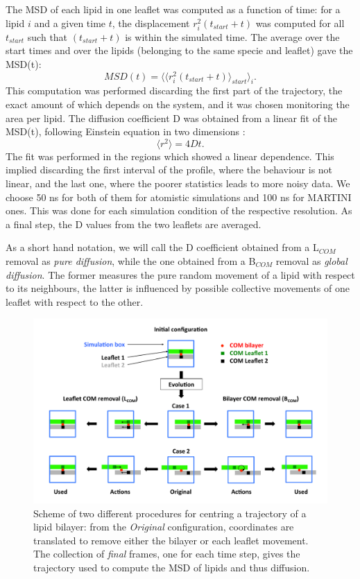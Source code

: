 \begin{itemize}
The MSD of each lipid in one leaflet was computed as a function of time: for a lipid $i$ and a given time $t$, the displacement $r_i^2(t_{start}+t)$ was computed for all $t_{start}$ such that $(t_{start}+t)$ is within the simulated time. The average over the start times and over the lipids (belonging to the same specie and leaflet) gave the MSD(t):
\begin{equation}
MSD(t) = \langle \langle r_i^2(t_{start}+t) \rangle_{start} \rangle_i.
\end{equation}
This computation was performed discarding the first part of the trajectory, the exact amount of which depends on the system, and it was chosen monitoring the area per lipid.
The diffusion coefficient D was obtained from a linear fit of the MSD(t), following Einstein equation in two dimensions \citep{Einstein1956}:
\begin{equation}
\langle r^2 \rangle = 4Dt.
\end{equation}
The fit was performed in the regions which showed a linear dependence. This implied discarding the first interval of the profile, where the behaviour is not linear, and the last one, where the poorer statistics leads to more noisy data. We choose 50 ns for both of them for atomistic simulations and 100 ns for MARTINI ones. This was done for each simulation condition of the respective resolution. As a final step, the D values from the two leaflets are averaged.

As a short hand notation, we will call the D coefficient obtained from a L$_{COM}$ removal as \emph{pure diffusion}, while the one obtained from a B$_{COM}$ removal as \emph{global diffusion}.
%
The former measures the pure random movement of a lipid with respect to its neighbours, the latter is influenced by possible collective movements of one leaflet with respect to the other.
\begin{figure}[t!]
\centering
\includegraphics[width=0.95\linewidth]{3results_capsule/pics/diff_comrem} 
\caption[Scheme of trajectories preprocessing for computation of diffusion]{Scheme of two different procedures for centring a trajectory of a lipid bilayer: from the \emph{Original} configuration, coordinates are translated to remove either the bilayer or each leaflet movement. The collection of \emph{final} frames, one for each time step, gives the trajectory used to compute the MSD of lipids and thus diffusion.}
\label{fig:com_rem_scheme}
\end{figure}
\end{itemize}

